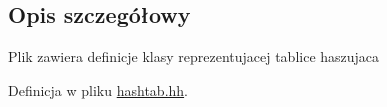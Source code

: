 \subsection{Opis szczegółowy}
Plik zawiera definicje klasy reprezentujacej tablice haszujaca 

Definicja w pliku \hyperlink{hashtab_8hh_source}{hashtab.\-hh}.

